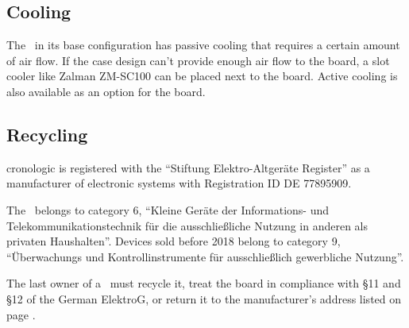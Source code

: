 \subsection{Cooling}

	The \deviceName\ in its base configuration has passive cooling that requires a certain amount of air flow. 
	If the case design can't provide enough air flow to the board, a slot cooler like Zalman ZM-SC100 can be placed next to the board. 
	Active cooling is also available as an option for the board.


\subsection{Recycling}

	cronologic is registered with the ``Stiftung Elektro-Altger\"a{}te Register'' as a manufacturer of electronic systems with Registration ID DE 77895909.\par
	The \deviceName\ belongs to category 6, ``Kleine Geräte der Informations- und Telekommunikationstechnik für die ausschließliche Nutzung in anderen als privaten Haushalten''. 
	Devices sold before 2018 belong to category 9, ``\"U{}berwachungs und Kontrollinstrumente f\"u{}r aus\-schlie\ss lich gewerbliche Nutzung''. 
	
	The last owner of a \deviceName\ must recycle it, treat the board in compliance with \S{}11 and \S{}12 of the German ElektroG, or return it to the manufacturer's address listed on page \pageref{cp:manu}.
	